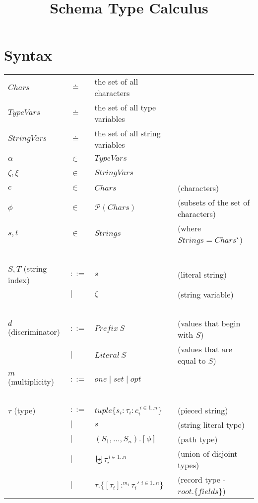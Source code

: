 \documentclass{article}
\title{Schema Type Calculus}
\begin{document}
\maketitle

\section*{Syntax}

\begin{tabular}{llll}
$\mathit{Chars}$ & $\doteq$ & the set of all characters \\
$\mathit{TypeVars}$ & $\doteq$ & the set of all type variables \\
$\mathit{StringVars}$ & $\doteq$ & the set of all string variables \\
$\alpha$ & $\in$ & $\mathit{TypeVars}$ & ~ \\
$\zeta,\xi$ & $\in$ & $\mathit{StringVars}$ & ~ \\
$c$ & $\in$ & $\mathit{Chars}$ & (characters) \\
$\phi$ & $\in$ & $\mathcal P(\mathit{Chars})$ & (subsets of the set of characters) \\
$s,t$ & $\in$ & $\mathit{Strings}$ & (where $\mathit{Strings} = \mathit{Chars}^{\star}$) \\~\\
$S,T$ (string index) & $::=$ & $s$ & (literal string) \\
                   & $\mid$ & $\zeta$ & (string variable) \\~\\
$d$ (discriminator) & $::=$  & $\mathit{Prefix}~S$ & (values that begin with $S$) \\
    & $\mid$ & $\mathit{Literal}~S$ & (values that are equal to $S$) \\
 & & \\
$m$ (multiplicity) & $::=$ & $\mathit{one} \mid \mathit{set} \mid \mathit{opt}$\\~\\
$\tau$ (type) & $::=$ & $\mathit{tuple} \{ s_i : \tau_i : c_i^{~i \in 1..n} \}$ & (pieced string) \\
       & $\mid$ & $s$ & (string literal type) \\
       & $\mid$ & $(S_1,\ldots,S_n).[\phi]$ & (path type) \\
       & $\mid$ & $\biguplus \tau_i^{~i \in 1..n}$ & (union of disjoint types) \\ 
       & $\mid$ & $\tau.\{[\tau_i] :^{m_i} \tau_i'~^{i \in 1..n}\}$ & (record type - $\mathit{root}.\{ fields \}$) \\ 

\end{tabular}
\end{document}
